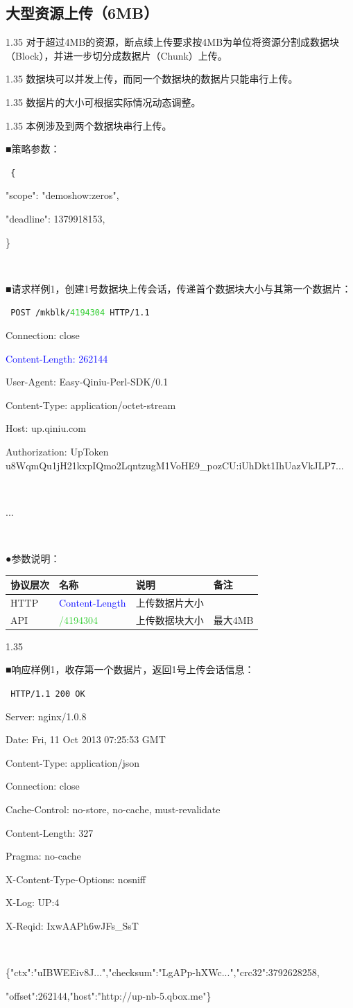 \documentclass[11pt, oneside]{book}
\newcommand{\qpara}[1]{
\vspace{0.2em}
\begin{spacing}{1.35}
\noindent
#1\par
\end{spacing}
\vspace{0.2em}
}
\newcommand{\qblock}[1]{
\vspace{0.1em}
\noindent
#1\par
\vspace{0.1em}
}
\newcommand{\qtable}[1]{\footnotesize\vspace{0.5em}#1\vspace{0.5em}\normalsize}
\newcommand{\qhttp}[1]{\noindent #1\par}
\begin{document}
\clearpage

\subsection{大型资源上传（6MB）}

\qpara{对于超过4MB的资源，断点续上传要求按4MB为单位将资源分割成数据块（Block），并进一步切分成数据片（Chunk）上传。}
\qpara{数据块可以并发上传，而同一个数据块的数据片只能串行上传。}
\qpara{数据片的大小可根据实际情况动态调整。}
\qpara{本例涉及到两个数据块串行上传。}

\qblock{■\thinspace 策略参数：}
{
\tt \footnotesize
\qhttp{\{}
\qhttp{    "scope":    "demoshow:zeros",}
\qhttp{    "deadline": 1379918153,}
\qhttp{\}}
\qhttp{\ }
}

\qblock{■\thinspace 请求样例1，创建1号数据块上传会话，传递首个数据块大小与其第一个数据片：}
{
\tt \footnotesize
\qhttp{POST /mkblk/\textcolor{LimeGreen}{4194304} HTTP/1.1}
\qhttp{Connection: close}
\qhttp{\textcolor{blue}{Content-Length: 262144}}
\qhttp{User-Agent: Easy-Qiniu-Perl-SDK/0.1}
\qhttp{Content-Type: application/octet-stream}
\qhttp{Host: up.qiniu.com}
\qhttp{Authorization: UpToken u8WqmQu1jH21kxpIQmo2LqntzugM1VoHE9\_pozCU:iUhDkt1IhUazVkJLP7...}
\qhttp{\ }
\qhttp{...}
\qhttp{\ }
}

\qblock{●\thinspace 参数说明：}
\qtable{
\def\arraystretch{2}
\begin{tabular}{|l|p{9em}|p{17em}|p{7em}|}
\hline
协议层次 & 名称 & 说明 & 备注 \\
\hline
HTTP & \textcolor{blue}{Content-Length} & 上传数据片大小 & \\
\hline
API & \textcolor{LimeGreen}{/4194304} & 上传数据块大小 & 最大4MB \\
\hline
\end{tabular}
}

\qpara{\ }

\qblock{■\thinspace 响应样例1，收存第一个数据片，返回1号上传会话信息：}
{
\tt \footnotesize
\qhttp{HTTP/1.1 200 OK}
\qhttp{Server: nginx/1.0.8}
\qhttp{Date: Fri, 11 Oct 2013 07:25:53 GMT}
\qhttp{Content-Type: application/json}
\qhttp{Connection: close}
\qhttp{Cache-Control: no-store, no-cache, must-revalidate}
\qhttp{Content-Length: 327}
\qhttp{Pragma: no-cache}
\qhttp{X-Content-Type-Options: nosniff}
\qhttp{X-Log: UP:4}
\qhttp{X-Reqid: IxwAAPh6wJFs\_SsT}
\qhttp{\ }
\qhttp{\{"ctx":"uIBWEEiv8J...","checksum":"LgAPp-hXWc...","crc32":3792628258,}
\qhttp{"offset":262144,"host":"http://up-nb-5.qbox.me"\}}
\qhttp{\ }
}
\end{document}
